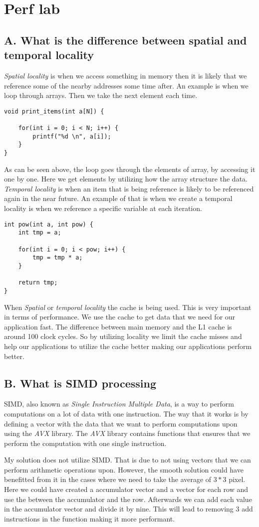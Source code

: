 \section{Perf lab}

\subsection{A. What is the difference between spatial and temporal locality}
\textit{Spatial locality} is when we access something in memory then it is likely that we reference some of the nearby addresses some time after. An example is
when we loop through arrays. Then we take the next element each time.
\begin{lstlisting}
void print_items(int a[N]) {

    for(int i = 0; i < N; i++) {
        printf("%d \n", a[i]);
    }
}
\end{lstlisting}
As can be seen above, the loop goes through the elements of array, by accessing it one by one. Here we get elements 
by utilizing how the array structure the data. \textit{Temporal locality} is when an item that is being reference is likely to be 
referenced again in the near future. An example of that is when we create a temporal locality is when we reference a specific variable
at each iteration.
\begin{lstlisting}
int pow(int a, int pow) {
    int tmp = a;

    for(int i = 0; i < pow; i++) {
        tmp = tmp * a;
    }

    return tmp;
}
\end{lstlisting}
When \textit{Spatial} or \textit{temporal locality} the cache is being used. This is very important in terms of performance.
We use the cache to get data that we need for our application fast. The difference between main memory and the L1 cache is around 100 clock cycles.
So by utilizing locality we limit the cache misses and help our applications to utilize the cache better making our applications perform better.

\subsection{B. What is SIMD processing}
SIMD, also known as \textit{Single Instruction Multiple Data}, is a way to perform computations on a lot of data
with one instruction. The way that it works is by defining a vector with the data that we want to perform computations
upon using the \textit{AVX} library. The \textit{AVX} library contains functions that ensures that we perform the computation 
with one single instruction. 

My solution does not utilize SIMD. That is due to not using vectors that we can perform arithmetic operations upon. However, the smooth
solution could have benefitted from it in the cases where we need to take the average of $3 * 3$ pixel. Here we could have created a accumulator vector
and a vector for each row and use the \code{+} between the accumulator and the row. Afterwards we can add each value in the accumulator vector and divide it by nine.
This will lead to removing 3 add instructions in the  function making it more performant.
